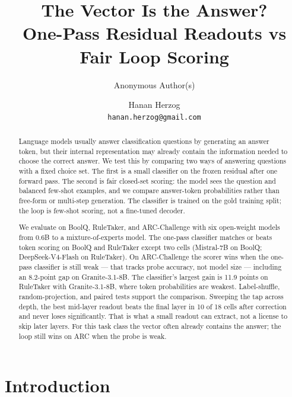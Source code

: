 \title{\textbf{The Vector Is the Answer?\\
One-Pass Residual Readouts vs Fair Loop Scoring}}
\ifdefined\AnonymousVersion
\author{Anonymous Author(s)}
\date{}
\else
\author{
  Hanan Herzog\\
  \texttt{hanan.herzog@gmail.com}
}
\date{}
\fi


\maketitle

\begin{abstract}
Language models usually answer classification questions by generating an answer
token, but their internal representation may already contain the information
needed to choose the correct answer. We test this by comparing two ways of
answering questions with a fixed choice set. The first is a small classifier
on the frozen residual after one forward pass. The second is fair closed-set
scoring: the model sees the question and balanced few-shot examples, and we
compare answer-token probabilities rather than free-form or multi-step
generation. The classifier is trained on the gold training split; the loop
is few-shot scoring, not a fine-tuned decoder.

We evaluate on BoolQ, RuleTaker, and ARC-Challenge with six open-weight models
from 0.6B to a mixture-of-experts model. The one-pass classifier matches or
beats token scoring on BoolQ and RuleTaker except two cells (Mistral-7B on
BoolQ; DeepSeek-V4-Flash on RuleTaker). On ARC-Challenge the scorer wins when
the one-pass classifier is still weak --- that tracks probe accuracy, not
model size --- including an 8.2-point gap on Granite-3.1-8B. The
classifier's largest gain is 11.9 points on RuleTaker with Granite-3.1-8B,
where token probabilities are weakest. Label-shuffle, random-projection, and
paired tests support the comparison. Sweeping the tap across depth, the best
mid-layer readout beats the final layer in 10 of 18 cells after correction and
never loses significantly. That is what a small readout can extract, not a
license to skip later layers. For this task class the vector often already
contains the answer; the loop still wins on ARC when the probe is weak.
\end{abstract}

\section{Introduction}

